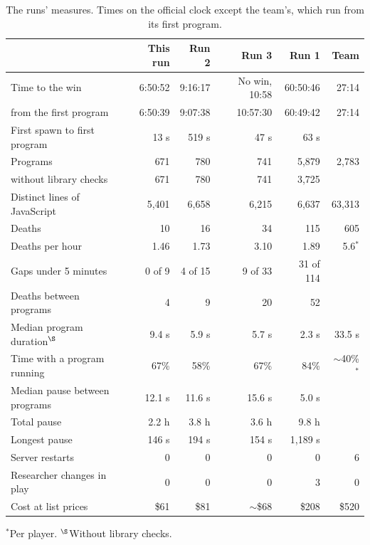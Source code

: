 \documentclass[11pt,a4paper]{article}
\begin{document}
\begin{table}[t]
  \caption{The runs' measures. Times on the official clock except the team's, which run from its first program.}
  \label{tab:headline}
  \small
  \begin{tabularx}{\textwidth}{@{}Xrrrrr@{}}
    \toprule
    & \textbf{This run} & \textbf{Run 2} & \textbf{Run 3} & \textbf{Run 1} & \textbf{Team} \\
    \midrule
    Time to the win & 6:50:52 & 9:16:17 & No win, 10:58 & 60:50:46 & 27:14 \\
    \quad from the first program & 6:50:39 & 9:07:38 & 10:57:30 & 60:49:42 & 27:14 \\
    First spawn to first program & 13 s & 519 s & 47 s & 63 s & \\
    Programs & 671 & 780 & 741 & 5,879 & 2,783 \\
    \quad without library checks & 671 & 780 & 741 & 3,725 & \\
    Distinct lines of JavaScript & 5,401 & 6,658 & 6,215 & 6,637 & 63,313 \\
    Deaths & 10 & 16 & 34 & 115 & 605 \\
    Deaths per hour & 1.46 & 1.73 & 3.10 & 1.89 & 5.6$^{*}$ \\
    Gaps under 5 minutes & 0 of 9 & 4 of 15 & 9 of 33 & 31 of 114 & \\
    Deaths between programs & 4 & 9 & 20 & 52 & \\
    Median program duration$^{\S}$ & 9.4 s & 5.9 s & 5.7 s & 2.3 s & 33.5 s \\
    Time with a program running & 67\% & 58\% & 67\% & 84\% & ${\sim}$40\%$^{*}$ \\
    Median pause between programs & 12.1 s & 11.6 s & 15.6 s & 5.0 s & \\
    Total pause & 2.2 h & 3.8 h & 3.6 h & 9.8 h & \\
    Longest pause & 146 s & 194 s & 154 s & 1,189 s & \\
    Server restarts & 0 & 0 & 0 & 0 & 6 \\
    Researcher changes in play & 0 & 0 & 0 & 3 & 0 \\
    Cost at list prices & \$61 & \$81 & ${\sim}$\$68 & \$208 & \$520 \\
    \bottomrule
  \end{tabularx}\par\vspace{3pt}
  {\footnotesize $^{*}$Per player. $^{\S}$Without library checks.}
\end{table}
\end{document}
